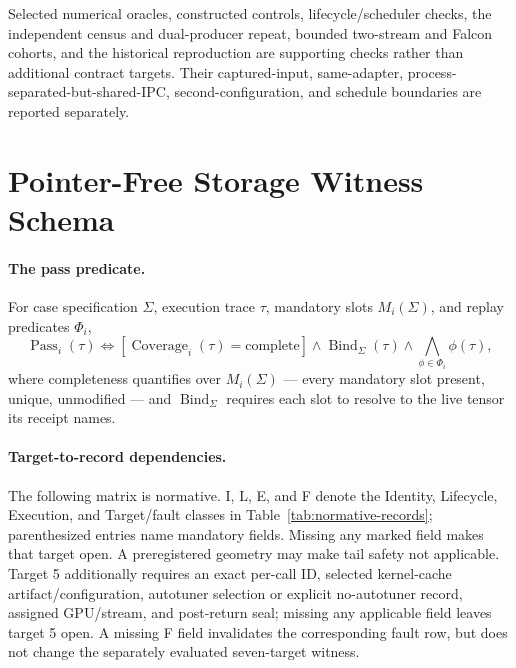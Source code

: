 \documentclass{article}
\begin{document}
Selected numerical oracles, constructed controls, lifecycle/scheduler checks,
the independent census and dual-producer repeat, bounded two-stream and Falcon
cohorts, and the historical reproduction are supporting checks rather than
additional contract targets.  Their captured-input, same-adapter,
process-separated-but-shared-IPC, second-configuration, and schedule boundaries
are reported separately.

\section{Pointer-Free Storage Witness Schema}
\label{app:storage-schema}

\paragraph{The pass predicate.}
For case specification \(\Sigma\), execution trace \(\tau\), mandatory slots
\(M_i(\Sigma)\), and replay predicates \(\Phi_i\),
\begin{equation}
  \operatorname{Pass}_i(\tau)\Longleftrightarrow
  [\operatorname{Coverage}_i(\tau)=\mathrm{complete}]
  \wedge\operatorname{Bind}_{\Sigma}(\tau)
  \wedge\bigwedge_{\phi\in\Phi_i}\phi(\tau),
\end{equation}
where completeness quantifies over \(M_i(\Sigma)\) --- every mandatory slot
present, unique, unmodified --- and \(\operatorname{Bind}_{\Sigma}\) requires
each slot to resolve to the live tensor its receipt names.

\paragraph{Target-to-record dependencies.}
The following matrix is normative.  I, L, E, and F denote the Identity,
Lifecycle, Execution, and Target/fault classes in Table~\ref{tab:normative-records};
parenthesized entries name mandatory fields.  Missing any marked field makes
that target open.  A preregistered geometry may make tail safety not applicable.
Target 5 additionally requires an exact per-call ID, selected kernel-cache
artifact/configuration, autotuner selection or explicit no-autotuner record,
assigned GPU/stream, and post-return seal; missing any applicable field leaves
target 5 open.  A missing F field invalidates the corresponding fault row,
but does not change the separately evaluated seven-target witness.
\end{document}
